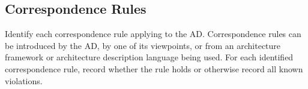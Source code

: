 \documentclass[a4paper, 12pt]{article}
\begin{document}
\subsection{Correspondence Rules} \label{sec:rules}
\begin{adjustwidth}{2em}{0pt}
Identify each correspondence rule applying to the AD. Correspondence rules can be introduced by the AD, by one of its viewpoints, or from an architecture framework or architecture description language being used. For each identified correspondence rule, record whether the rule holds or otherwise record all known violations. 
\end{adjustwidth}
\end{document}
